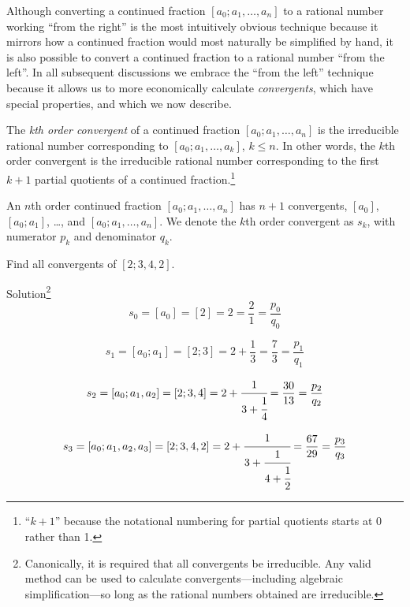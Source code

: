 Although converting a continued fraction $[a_0; a_1, \ldots{}, a_n]$
to a rational number working ``from the right'' is the most
intuitively obvious technique because it mirrors how a 
continued fraction would most naturally be simplified by
hand, it is also possible to convert a continued fraction to
a rational number ``from the left''.  In all subsequent
discussions we embrace the ``from the left'' technique because 
it allows us to more economically calculate \emph{convergents}, which 
have special properties, and which we now describe.

The \emph{kth order convergent} of a continued fraction
$[a_0; a_1, \ldots{}, a_n]$ is the irreducible rational number
corresponding to $[a_0; a_1, \ldots{}, a_k]$, $k \leq n$.
In other words, the $k$th order convergent is the irreducible rational number
corresponding to the first $k+1$ partial quotients of a 
continued fraction.\footnote{``$k+1$'' because the notational
numbering
for partial quotients starts at 0 rather than 1.} 

An $n$th order continued fraction $[a_0; a_1, \ldots{}, a_n]$
has $n+1$ convergents, $[a_0]$, 
$[a_0; a_1]$, \ldots{}, and $[a_0; a_1, \ldots{}, a_n]$.
We denote the $k$th order convergent as $s_k$, with numerator
$p_k$ and denominator $q_k$.

\begin{vworkexamplestatement}
\label{ex:ccfr0:scnv0:convergentexample:01}
Find all convergents of $[2;3,4,2]$.
\end{vworkexamplestatement}
\begin{vworkexampleparsection}{Solution}\hspace{-0.4em}\footnote{Canonically, it is
required that all convergents be irreducible.  Any valid method can be used to
calculate convergents---including algebraic simplification---so long as the 
rational numbers obtained are irreducible.}
\begin{equation}
s_0 = [a_0] = [2] = 2 = \frac{2}{1} = \frac{p_0}{q_0}
\end{equation}

\begin{equation}
s_1 = [a_0;a_1] = [2;3] = 2 + \frac{1}{3} = \frac{7}{3} = \frac{p_1}{q_1}
\end{equation}

\begin{equation}
s_2 = [a_0;a_1,a_2] =
[2;3,4] =
2 + \cfrac{1}{3 + \cfrac{1}{4}} = \frac{30}{13} = \frac{p_2}{q_2}
\end{equation}

\begin{equation}
s_3 = [a_0;a_1,a_2,a_3] = [2;3,4,2] =
2 + \cfrac{1}{3 + \cfrac{1}{4 + \cfrac{1}{2}}} = \frac{67}{29} = \frac{p_3}{q_3}
\end{equation}
\end{vworkexampleparsection}
\vworkexamplefooter{}

